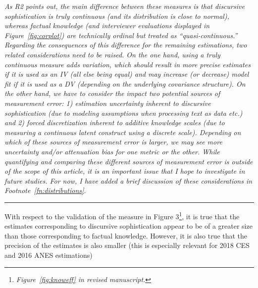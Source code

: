 \textit{As R2 points out, the main difference between these measures is that discursive sophistication is truly continuous (and its distribution is close to normal), whereas factual knowledge (and interviewer evaluations displayed in Figure~\ref{fig:corplot}) are technically ordinal but treated as ``quasi-continuous.'' Regarding the consequences of this difference for the remaining estimations, two related considerations need to be raised. On the one hand, using a truly continuous measure adds variation, which should result in more precise estimates if it is used as an IV (all else being equal) and may increase (or decrease) model fit if it is used as a DV (depending on the underlying covariance structure). On the other hand, we have to consider the impact two potential sources of measurement error: 1) estimation uncertainty inherent to discursive sophistication (due to modeling assumptions when processing text as data etc.) and 2) forced discretization inherent to additive knowledge scales (due to measuring a continuous latent construct using a discrete scale). Depending on which of these sources of measurement error is larger, we may see more uncertainty and/or attenuation bias for one metric or the other. While quantifying and comparing these different sources of measurement error is outside of the scope of this article, it is an important issue that I hope to investigate in future studies. For now, I have added a brief discussion of these considerations in Footnote~\ref{fn:distributions}.}


\rule{\linewidth}{.01cm}

With respect to the validation of the measure in Figure 3\footnote{\textit{Figure~\ref{fig:knoweff} in revised manuscript.}}, it is true that the estimates corresponding to discursive sophistication appear to be of a greater size than those corresponding to factual knowledge. However, it is also true that the precision of the estimates is also smaller (this is especially relevant for 2018 CES and 2016 ANES estimations)

